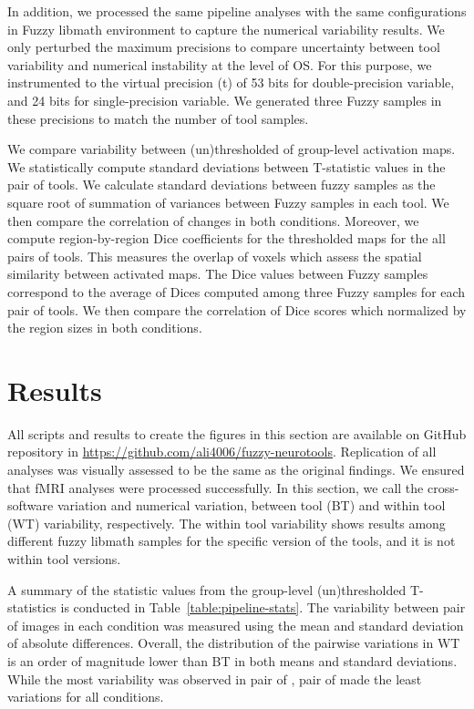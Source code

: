 \documentclass[conference]{IEEEtran}
\begin{document}
In addition, we processed the same pipeline analyses with the same configurations in Fuzzy libmath environment
to capture the numerical variability results. 
We only perturbed the maximum precisions to compare uncertainty between tool variability and numerical instability at the level of OS.
For this purpose, we instrumented to the virtual precision (t) of 53 bits for double-precision variable,
and 24 bits for single-precision variable. We generated three Fuzzy samples in these precisions to match the number of tool samples.

We compare variability between (un)thresholded of group-level activation maps.
We statistically compute standard deviations between T-statistic values in the pair of tools.
We calculate standard deviations between fuzzy samples as the square root of summation of variances between Fuzzy samples in each tool.
We then compare the correlation of changes in both conditions.
Moreover, we compute region-by-region Dice coefficients for the thresholded maps for the all pairs of tools.
This measures the overlap of voxels which assess the spatial similarity between activated maps.
The Dice values between Fuzzy samples correspond to the average of Dices computed among three Fuzzy samples for each pair of tools.
We then compare the correlation of Dice scores which normalized by the region sizes in both conditions.




\section{Results}
All scripts and results to create the figures in this section are available on GitHub repository
in \url{https://github.com/ali4006/fuzzy-neurotools}.
Replication of all analyses was visually assessed to be the same as the original findings.
We ensured that fMRI analyses were processed successfully.
In this section, we call the cross-software variation and numerical variation,
between tool (BT) and within tool (WT) variability, respectively. 
The within tool variability shows results among different fuzzy libmath
samples for the specific version of the tools, and it is not within tool versions.


A summary of the statistic values from the group-level (un)thresholded T-statistics is conducted in
Table~\ref{table:pipeline-stats}.
The variability between pair of images in each condition was measured using the mean and standard deviation of absolute differences.
Overall, the distribution of the pairwise variations in WT is an order of magnitude lower than BT in both means and standard deviations.
While the most variability was observed in pair of \fslafni, pair of \fslspm made the least variations for all conditions.
\end{document}
